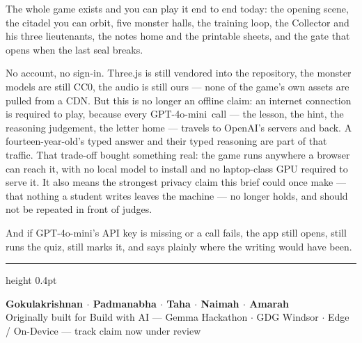 \documentclass[11pt]{article}
\newcommand{\themodel}{GPT-4o-mini}
\begin{document}
\vspace{0.3em}
The whole game exists and you can play it end to end today: the opening scene,
the citadel you can orbit, five monster halls, the training loop, the Collector
and his three lieutenants, the notes home and the printable sheets, and the
gate that opens when the last seal breaks.

No account, no sign-in. Three.js is still vendored into the repository, the
monster models are still CC0, the audio is still ours --- none of the game's
own assets are pulled from a CDN. But this is no longer an offline claim: an
internet connection is required to play, because every \themodel\ call ---
the lesson, the hint, the reasoning judgement, the letter home --- travels to
OpenAI's servers and back. A fourteen-year-old's typed answer and their typed
reasoning are part of that traffic. That trade-off bought something real: the
game runs anywhere a browser can reach it, with no local model to install and
no laptop-class GPU required to serve it. It also means the strongest privacy
claim this brief could once make --- that nothing a student writes leaves the
machine --- no longer holds, and should not be repeated in front of judges.

And if \themodel's API key is missing or a call fails, the app still opens,
still runs the quiz, still marks it, and says plainly where the writing would
have been.

\vfill
{\color{Muted}\hrule height 0.4pt}
\vspace{0.6em}
\begin{center}
{\sffamily\small\bfseries\color{Coral}Gokulakrishnan $\cdot$ Padmanabha $\cdot$
Taha $\cdot$ Naimah $\cdot$ Amarah}\\[0.3em]
{\small\color{Muted}Originally built for Build with AI --- Gemma Hackathon
$\cdot$ GDG Windsor $\cdot$ Edge / On-Device --- track claim now under review}
\end{center}
\end{document}
